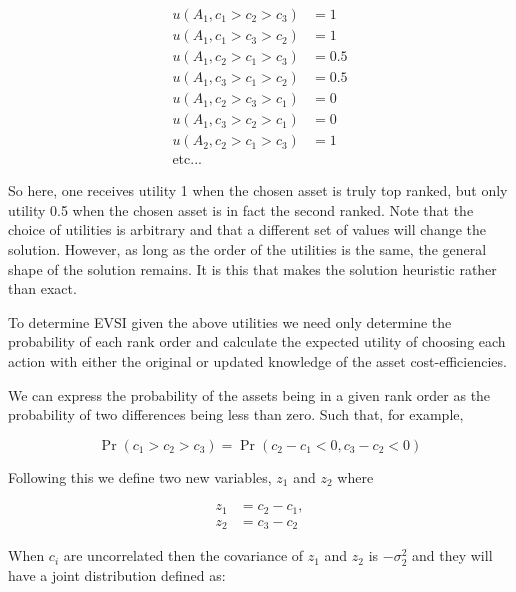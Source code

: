 \documentclass[]{article}
\theoremstyle{definition}
\theoremstyle{definition}
\theoremstyle{remark}
\begin{document}
\begin{equation}
\begin{aligned}
u(A_1, c_1 > c_2 > c_3)&=1\\
u(A_1, c_1 > c_3 > c_2)&=1\\
u(A_1, c_2 > c_1 > c_3)&=0.5\\
u(A_1, c_3 > c_1 > c_2)&=0.5\\
u(A_1, c_2 > c_3 > c_1)&=0\\
u(A_1, c_3 > c_2 > c_1)&=0\\
u(A_2, c_2 > c_1 > c_3)&=1\\
\mathrm{etc...}&
\end{aligned}
\label{eq:utilities}
\end{equation}

So here, one receives utility 1 when the chosen asset is truly top
ranked, but only utility 0.5 when the chosen asset is in fact the second
ranked. Note that the choice of utilities is arbitrary and that a
different set of values will change the solution. However, as long as
the order of the utilities is the same, the general shape of the
solution remains. It is this that makes the solution heuristic rather
than exact.

To determine EVSI given the above utilities we need only determine the
probability of each rank order and calculate the expected utility of
choosing each action with either the original or updated knowledge of
the asset cost-efficiencies.

We can express the probability of the assets being in a given rank order
as the probability of two differences being less than zero. Such that,
for example,

\begin{equation}
\Pr(c_1 > c_2 > c_3) = \Pr(c_2 - c_1 < 0,  c_3 - c_2 < 0)
\label{eq:probrank}
\end{equation}

Following this we define two new variables, \(z_1\) and \(z_2\) where

\begin{equation}
\begin{aligned}
  z_1 &= c_2 - c_1,\\
  z_2 &= c_3 - c_2
\end{aligned}
\label{eq:z12}
\end{equation}

When \(c_i\) are uncorrelated then the covariance of \(z_1\) and \(z_2\)
is \(-\sigma^2_2\) and they will have a joint distribution defined as:
\end{document}
